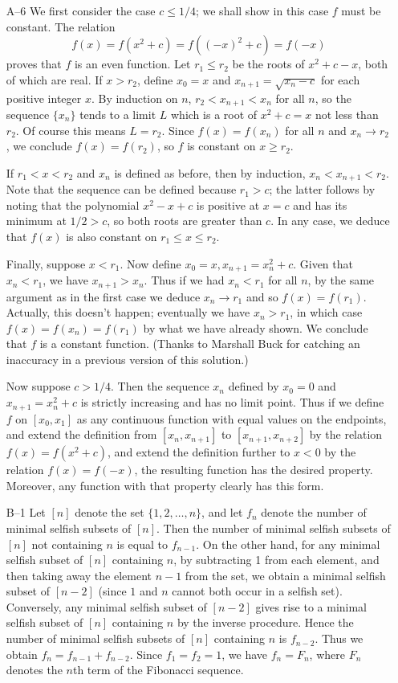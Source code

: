 \documentclass[amssymb,twocolumn,pra,10pt,aps]{revtex4-1}
\begin{document}
\begin{itemize}
\item[A--6]
We first consider the case $c \leq 1/4$; we shall show in this case
$f$ must be constant. The relation
\[
f(x) = f(x^2 + c) = f((-x)^2 + c) = f(-x)
\]
proves that $f$ is an even function. Let $r_1 \leq r_2$ be the roots of
$x^2 + c - x$, both of which are real. If $x > r_{2}$, define $x_{0} =
x$ and $x_{n+1} = \sqrt{x_{n} - c}$ for each positive integer $x$. By
induction on $n$, $r_{2} < x_{n+1} < x_{n}$ for all $n$, so the
sequence $\{x_{n}\}$ tends to a limit $L$ which is a root of $x^{2} +
c = x$ not less than $r_{2}$. Of course this means $L = r_{2}$.
Since $f(x) = f(x_{n})$ for all $n$ and $x_{n} \to r_{2}$, we
conclude $f(x) = f(r_{2})$, so $f$ is constant on $x \geq r_{2}$.

If $r_{1} < x < r_{2}$ and $x_{n}$ is defined as before, then by
induction, $x_{n} < x_{n+1} < r_{2}$. Note that the
sequence can be defined because $r_{1} > c$; the latter follows by
noting that the polynomial $x^{2} - x + c$ is positive at $x = c$ and
has its minimum at $1/2 > c$, so both roots are greater than $c$. In
any case, we deduce that $f(x)$ is also constant on $r_{1} \leq x \leq
r_{2}$.

Finally, suppose $x < r_{1}$. Now define $x_{0} = x, x_{n+1} =
x_{n}^{2} + c$. Given that $x_{n} < r_{1}$, we have $x_{n+1} >
x_{n}$. Thus if we had $x_{n} < r_{1}$ for all $n$, by the same argument as
in the first case we deduce $x_{n} \to r_{1}$ and so $f(x) =
f(r_{1})$. Actually, this doesn't happen; eventually we have $x_{n} >
r_{1}$, in which case $f(x) = f(x_{n}) = f(r_{1})$ by what we have
already shown. We conclude that $f$ is a constant function. (Thanks
to Marshall Buck for catching an inaccuracy in a previous version of
this solution.)

Now suppose $c > 1/4$. Then the sequence $x_n$ defined by $x_0 = 0$
and $x_{n+1} = x_n^2 + c$ is strictly increasing and has no limit
point. Thus if we define $f$ on $[x_0, x_1]$ as any continuous
function with equal values on the endpoints, and extend the definition
from $[x_n, x_{n+1}]$ to $[x_{n+1}, x_{n+2}]$ by the relation $f(x) =
f(x^2 + c)$, and extend the definition further to $x < 0$ by the
relation $f(x) = f(-x)$, the resulting function has the desired
property. Moreover, any function with that property clearly has this form.

\item[B--1]
Let $[n]$ denote the set $\{1,2,\ldots,n\}$, and let $f_n$ denote the
number of minimal selfish subsets of $[n]$.  Then the number of
minimal selfish subsets of $[n]$ not containing $n$ is equal to
$f_{n-1}$.  On the other hand, for any minimal selfish subset of $[n]$
containing $n$, by subtracting 1 from each element, and then taking
away the element $n-1$ from the set, we obtain a minimal selfish
subset of $[n-2]$ (since $1$ and $n$ cannot both occur in a selfish
set).  Conversely, any minimal selfish subset of $[n-2]$ gives rise to
a minimal selfish subset of $[n]$ containing $n$ by the inverse
procedure.  Hence the number of minimal selfish subsets of $[n]$
containing $n$ is $f_{n-2}$.  Thus we obtain $f_n=f_{n-1}+f_{n-2}$.
Since $f_1=f_2=1$, we have $f_n=F_n$, where $F_n$ denotes the $n$th
term of the Fibonacci sequence.


\end{itemize}
\end{document}
